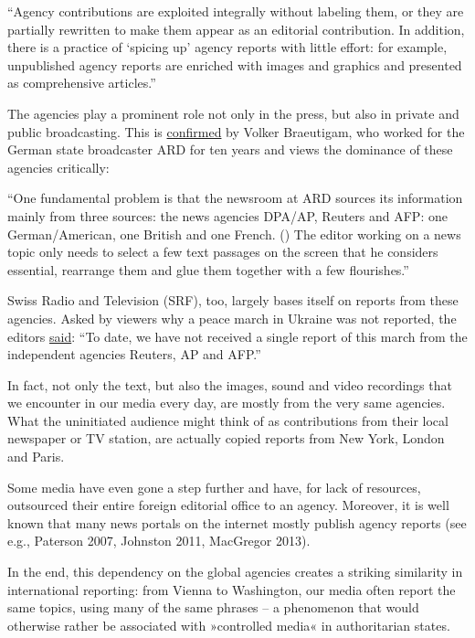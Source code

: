 ``Agency contributions are exploited integrally without labeling them,
or they are partially rewritten to make them appear as an editorial
contribution. In addition, there is a practice of `spicing up' agency
reports with little effort: for example, unpublished agency reports are
enriched with images and graphics and presented as comprehensive
articles.''

The agencies play a prominent role not only in the press, but also in
private and public broadcasting. This is
\href{http://www.heise.de/tp/artikel/47/47821/3.html}{confirmed} by
Volker Braeutigam, who worked for the German state broadcaster ARD for
ten years and views the dominance of these agencies critically:

``One fundamental problem is that the newsroom at ARD sources its
information mainly from three sources: the news agencies DPA/AP, Reuters
and AFP: one German/American, one British and one French. () The editor
working on a news topic only needs to select a few text passages on the
screen that he considers essential, rearrange them and glue them
together with a few flourishes.''

Swiss Radio and Television (SRF), too, largely bases itself on reports
from these agencies. Asked by viewers why a peace march in Ukraine was
not reported, the editors
\href{http://www.srf.ch/sendungen/hallosrf/warum-berichtet-srf-nicht-ueber-den-friedensmarsch-in-der-ukraine}{said}:
``To date, we have not received a single report of this march from the
independent agencies Reuters, AP and AFP.''

In fact, not only the text, but also the images, sound and video
recordings that we encounter in our media every day, are mostly from the
very same agencies. What the uninitiated audience might think of as
contributions from their local newspaper or TV station, are actually
copied reports from New York, London and Paris.

Some media have even gone a step further and have, for lack of
resources, outsourced their entire foreign editorial office to an
agency. Moreover, it is well known that many news portals on the
internet mostly publish agency reports (see e.g., Paterson 2007,
Johnston 2011, MacGregor 2013).

In the end, this dependency on the global agencies creates a striking
similarity in international reporting: from Vienna to Washington, our
media often report the same topics, using many of the same phrases -- a
phenomenon that would otherwise rather be associated with »controlled
media« in authoritarian states.

